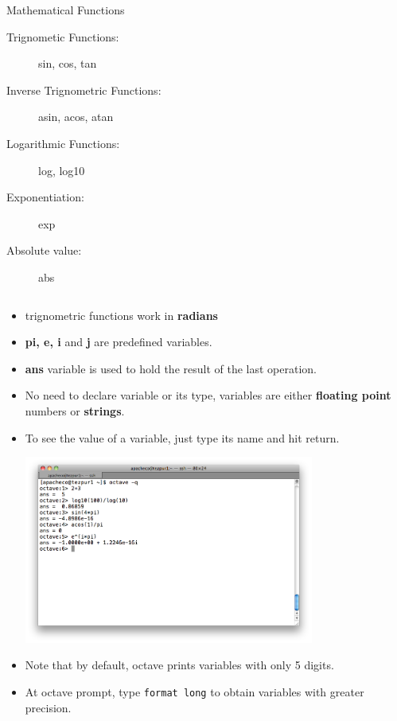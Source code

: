 \documentclass[t,compress,xcolor=svgnames]{beamer}
\newenvironment{eblock}[0]
{
\begin{beamerboxesrounded}[upper=uppercol2,lower=lowercol2,shadow=true]}
{\end{beamerboxesrounded}}
\begin{document}
\begin{frame}[allowframebreaks]
\begin{columns}
\begin{eblock}{Mathematical Functions}
\begin{description}
        \item[Trignometic Functions:] sin, cos, tan
        \item[Inverse Trignometric Functions:] asin, acos, atan
        \item[Logarithmic Functions:] log, log10
        \item[Exponentiation:] exp
        \item[Absolute value:] abs
      \end{description}
    \end{eblock}
  \end{columns}
  \begin{itemize}
    \item trignometric functions work in \textbf{radians}
    \item \textbf{pi, e, i} and \textbf{j} are predefined variables.
    \item \textbf{ans} variable is used to hold the result of the last operation.
    \item No need to declare variable or its type, variables are either \textbf{floating point} numbers or \textbf{strings}.
    \item To see the value of a variable, just type its name and hit return.
    \begin{center}
      \includegraphics[width=0.75\textwidth,clip=true]{octave-simple}
    \end{center}
    \item Note that by default, octave prints variables with only 5 digits.
    \item At octave prompt, type \texttt{format long} to obtain variables with greater precision.
  \end{itemize}
\end{frame}
\end{document}
